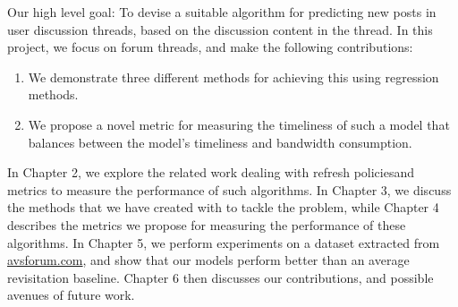 Our high level goal: To devise a suitable algorithm for predicting new posts in 
user discussion threads, based on the discussion content in the thread. In this 
project, we focus on forum threads, and make the following contributions:
\begin{enumerate}
	\item We demonstrate three different methods for achieving this using 
regression methods.
	\item We propose a novel metric for measuring the timeliness of such a model 
that balances between the model's timeliness and bandwidth consumption.
\end{enumerate}

In Chapter 2, we explore the related work dealing with refresh policiesand 
metrics to measure the performance of such algorithms. In Chapter 3, we discuss 
the methods that we have created with to tackle the problem, while Chapter 4 
describes the metrics we propose for measuring the performance of these 
algorithms.  In Chapter 5, we perform experiments on a dataset extracted from 
\url{avsforum.com}, 
and show that our models perform better than 
an average revisitation baseline. Chapter 6 then discusses our contributions, 
and possible avenues of future work.
